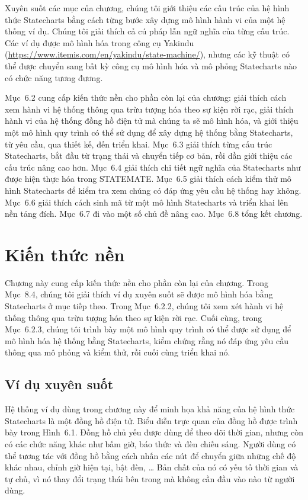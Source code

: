 Xuyên suốt các mục của chương, chúng tôi giới thiệu các cấu trúc của hệ hình thức Statecharts bằng cách từng bước xây dựng mô hình hành vi của một hệ thống ví dụ. Chúng tôi giải thích cả cú pháp lẫn ngữ nghĩa của từng cấu trúc. Các ví dụ được mô hình hóa trong công cụ Yakindu (\url{https://www.itemis.com/en/yakindu/state-machine/}), nhưng các kỹ thuật có thể được chuyển sang bất kỳ công cụ mô hình hóa và mô phỏng Statecharts nào có chức năng tương đương.

Mục~6.2 cung cấp kiến thức nền cho phần còn lại của chương: giải thích cách xem hành vi hệ thống thông qua trừu tượng hóa theo sự kiện rời rạc, giải thích hành vi của hệ thống đồng hồ điện tử mà chúng ta sẽ mô hình hóa, và giới thiệu một mô hình quy trình có thể sử dụng để xây dựng hệ thống bằng Statecharts, từ yêu cầu, qua thiết kế, đến triển khai. Mục~6.3 giải thích từng cấu trúc Statecharts, bắt đầu từ trạng thái và chuyển tiếp cơ bản, rồi dần giới thiệu các cấu trúc nâng cao hơn. Mục~6.4 giải thích chi tiết ngữ nghĩa của Statecharts như được hiện thực hóa trong STATEMATE. Mục~6.5 giải thích cách kiểm thử mô hình Statecharts để kiểm tra xem chúng có đáp ứng yêu cầu hệ thống hay không. Mục~6.6 giải thích cách sinh mã từ một mô hình Statecharts và triển khai lên nền tảng đích. Mục~6.7 đi vào một số chủ đề nâng cao. Mục~6.8 tổng kết chương.

\section{Kiến thức nền}
Chương này cung cấp kiến thức nền cho phần còn lại của chương. Trong Mục~8.4, chúng tôi giải thích ví dụ xuyên suốt sẽ được mô hình hóa bằng Statecharts ở mục tiếp theo. Trong Mục~6.2.2, chúng tôi xem xét hành vi hệ thống thông qua trừu tượng hóa theo sự kiện rời rạc. Cuối cùng, trong Mục~6.2.3, chúng tôi trình bày một mô hình quy trình có thể được sử dụng để mô hình hóa hệ thống bằng Statecharts, kiểm chứng rằng nó đáp ứng yêu cầu thông qua mô phỏng và kiểm thử, rồi cuối cùng triển khai nó.

\subsection{Ví dụ xuyên suốt}
Hệ thống ví dụ dùng trong chương này để minh họa khả năng của hệ hình thức Statecharts là một đồng hồ điện tử. Biểu diễn trực quan của đồng hồ được trình bày trong Hình~6.1. Đồng hồ chủ yếu được dùng để theo dõi thời gian, nhưng còn có các chức năng khác như bấm giờ, báo thức và đèn chiếu sáng. Người dùng có thể tương tác với đồng hồ bằng cách nhấn các nút để chuyển giữa những chế độ khác nhau, chỉnh giờ hiện tại, bật đèn, \ldots{} Bản chất của nó có yếu tố thời gian và tự chủ, vì nó thay đổi trạng thái bên trong mà không cần đầu vào nào từ người dùng.

